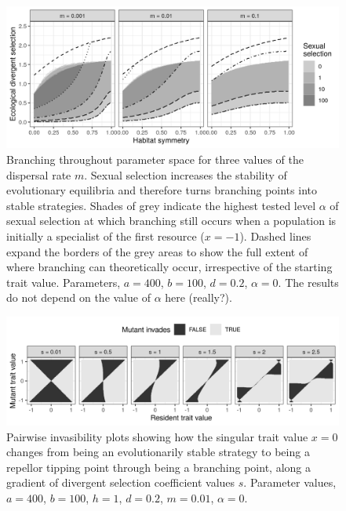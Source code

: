 \begin{figure}
    \centering
    \includegraphics[width=\textwidth]{figures/map_branching_points}
    \caption{Branching throughout parameter space for three values of the dispersal rate $m$. Sexual selection increases the stability of evolutionary equilibria and therefore turns branching points into stable strategies. Shades of grey indicate the highest tested level $\alpha$ of sexual selection at which branching still occurs when a population is initially a specialist of the first resource ($x = -1$). Dashed lines expand the borders of the grey areas to show the full extent of where branching can theoretically occur, irrespective of the starting trait value. Parameters, $a = 400$, $b = 100$, $d = 0.2$, $\alpha = 0$. The results do not depend on the value of $\alpha$ here (really?).}
    \label{fig:map_branching_points}
\end{figure}

\begin{figure}
    \centering
    \includegraphics[width=\textwidth]{figures/pairwise_invasibility_plots}
    \caption{Pairwise invasibility plots showing how the singular trait value $x = 0$ changes from being an evolutionarily stable strategy to being a repellor tipping point through being a branching point, along a gradient of divergent selection coefficient values $s$. Parameter values, $a = 400$, $b = 100$, $h = 1$, $d = 0.2$, $m = 0.01$, $\alpha = 0$.}
    \label{fig:pairwise_invasibility}
\end{figure}

